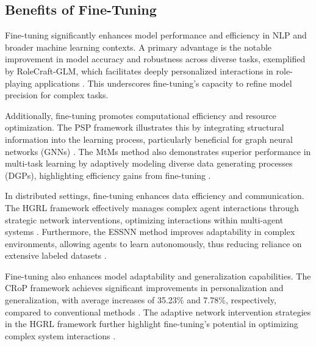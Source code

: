 


\subsection{Benefits of Fine-Tuning} \label{subsec:Benefits of Fine-Tuning}



Fine-tuning significantly enhances model performance and efficiency in NLP and broader machine learning contexts. A primary advantage is the notable improvement in model accuracy and robustness across diverse tasks, exemplified by RoleCraft-GLM, which facilitates deeply personalized interactions in role-playing applications \cite{tao2024rolecraftglmadvancingpersonalizedroleplaying}. This underscores fine-tuning's capacity to refine model precision for complex tasks.

Additionally, fine-tuning promotes computational efficiency and resource optimization. The PSP framework illustrates this by integrating structural information into the learning process, particularly beneficial for graph neural networks (GNNs) \cite{ge2024psppretrainingstructureprompt}. The MtMs method also demonstrates superior performance in multi-task learning by adaptively modeling diverse data generating processes (DGPs), highlighting efficiency gains from fine-tuning \cite{stank2024designingtimeseriesmodelshypernetworks}.

In distributed settings, fine-tuning enhances data efficiency and communication. The HGRL framework effectively manages complex agent interactions through strategic network interventions, optimizing interactions within multi-agent systems \cite{chen2024adaptivenetworkinterventioncomplex}. Furthermore, the ESSNN method improves adaptability in complex environments, allowing agents to learn autonomously, thus reducing reliance on extensive labeled datasets \cite{le2019evolvingselfsupervisedneuralnetworks}.

Fine-tuning also enhances model adaptability and generalization capabilities. The CRoP framework achieves significant improvements in personalization and generalization, with average increases of 35.23\% and 7.78\%, respectively, compared to conventional methods \cite{kaur2024cropcontextwiserobuststatic}. The adaptive network intervention strategies in the HGRL framework further highlight fine-tuning's potential in optimizing complex system interactions \cite{chen2024adaptivenetworkinterventioncomplex}.

